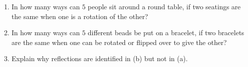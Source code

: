 \begin{enumerate}
\item[(a)] In how many ways can $5$ people sit around a round table, if two seatings are the same when one is a rotation of the other?
\item[(b)] In how many ways can $5$ different beads be put on a bracelet, if two bracelets are the same when one can be rotated or flipped over to give the other?
\item[(c)] Explain why reflections are identified in (b) but not in (a).
\end{enumerate}
